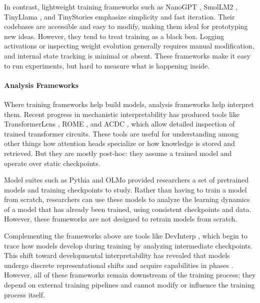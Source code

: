In contrast, lightweight training frameworks such as NanoGPT \citep{karpathy2023nanogpt}, SmolLM2 \citep{allal2025smollm2}, TinyLlama \citep{zhang2024tinyllama}, and TinyStories \citep{eldan2023tinystories} emphasize simplicity and fast iteration. Their codebases are accessible and easy to modify, making them ideal for prototyping new ideas. However, they tend to treat training as a black box. Logging activations or inspecting weight evolution generally requires manual modification, and internal state tracking is minimal or absent. These frameworks make it easy to run experiments, but hard to measure what is happening inside.


\paragraph{Analysis Frameworks}
Where training frameworks help build models, analysis frameworks help interpret them. Recent progress in mechanistic interpretability has produced tools like TransformerLens \citep{nanda2022transformerlens}, ROME \citep{meng2022locating}, and ACDC \citep{conmy2023towards}, which allow detailed inspection of trained transformer circuits. These tools are useful for understanding among other things how attention heads specialize or how knowledge is stored and retrieved. But they are mostly post-hoc: they assume a trained model and operate over static checkpoints.

Model suites such as Pythia \citep{biderman2023pythia} and OLMo \citep{groeneveld2024olmo} provided researchers a set of pretrained models and training checkpoints to study. Rather than having to train a model from scratch, researchers can use these models to analyze the learning dynamics of a model that has already been trained, using consistent checkpoints and data. However, these frameworks are not designed to retrain models from scratch.

Complementing the frameworks above are tools like DevInterp \citep{devinterpcode}, which begin to trace how models develop during training by analyzing intermediate checkpoints. This shift toward developmental interpretability has revealed that models undergo discrete representational shifts and acquire capabilities in phases \citep{hoogland2023towards, hoogland2025losslandscape}. However, all of these frameworks remain downstream of the training process; they depend on external training pipelines and cannot modify or influence the training process itself.

